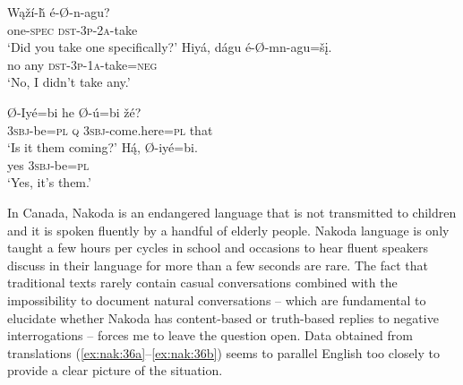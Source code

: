 \documentclass[output=paper,colorlinks,citecolor=brown]{langscibook}
\begin{document}
\ea\label{ex:nak:34}
    \begin{xlist}[Q: ]
    \label{ex:nak:34Q}
        \gll Wąží-ȟ é-Ø-n-agu?  \\ 
             one-\textsc{spec} \textsc{dst-3p-2a}-take \\
        \glt ‘Did you take one specifically?’ 
    \label{ex:nak:34A}
        \gll Hiyá, dágu é-Ø-mn-agu=šį. \\
              no any \textsc{dst-3p-1a}-take=\textsc{neg} \\
        \glt ‘No, I didn’t take any.’
    \end{xlist}
\z

\ea\label{ex:nak:35}
    \begin{xlist}[Q: ]
    \label{ex:nak:35a}
        \gll Ø-Iyé=bi he Ø-ú=bi žé?  \\ 
             \textsc{3sbj}-be=\textsc{pl} \textsc{q} \textsc{3sbj}-come.here=\textsc{pl} that  \\
        \glt ‘Is it them coming?’
    \label{ex:nak:35b}
        \gll H\'{ą}, Ø-iyé=bi. \\ 
             yes \textsc{3sbj}-be=\textsc{pl} \\
        \glt ‘Yes, it’s them.’
    \end{xlist}
\z 

In Canada, Nakoda is an endangered language that is not transmitted to children and it is spoken fluently by a handful of elderly people. Nakoda language is only taught a few hours per cycles in school and occasions to hear fluent speakers discuss in their language for more than a few seconds are rare. The fact that traditional texts rarely contain casual conversations combined with the impossibility to document natural conversations -- which are fundamental to elucidate whether Nakoda has content-based or truth-based replies to negative interrogations -- forces me to leave the question open. Data obtained from translations (\ref{ex:nak:36a}--\ref{ex:nak:36b}) seems to parallel English too closely to provide a clear picture of the situation.
\end{document}
